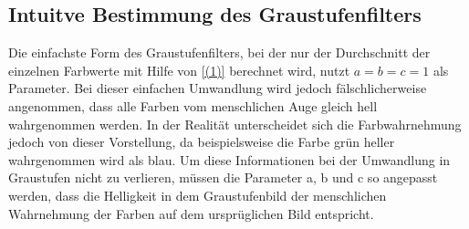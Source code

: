 \documentclass[course=erap]{aspdoc}
\begin{document}
	\subsection{Intuitve Bestimmung des Graustufenfilters}
	Die einfachste Form des Graustufenfilters, bei der nur der Durchschnitt der einzelnen Farbwerte mit Hilfe von \eqref{(1)} berechnet wird, nutzt $a=b=c=1$ als Parameter. Bei dieser einfachen Umwandlung wird jedoch fälschlicherweise angenommen, dass alle Farben vom menschlichen Auge gleich hell wahrgenommen werden. In der Realität unterscheidet sich die Farbwahrnehmung jedoch von dieser Vorstellung, da beispielsweise die Farbe grün heller wahrgenommen wird als blau. Um diese Informationen bei der Umwandlung in Graustufen nicht zu verlieren, müssen die Parameter a, b und c so angepasst werden, dass die Helligkeit in dem Graustufenbild der menschlichen Wahrnehmung der Farben auf dem ursprüglichen Bild entspricht.
\end{document}
